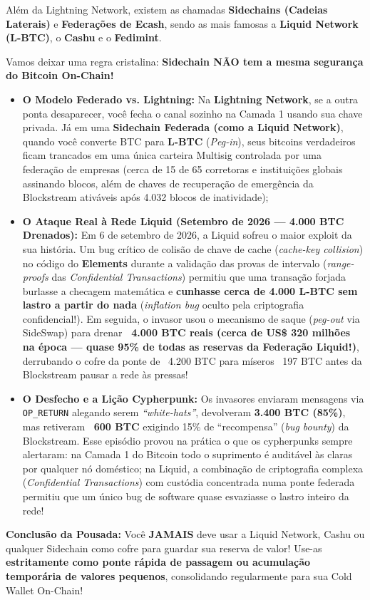 \documentclass{pousadaguide}
\begin{document}
Além da Lightning Network, existem as chamadas \textbf{Sidechains (Cadeias Laterais)} e \textbf{Federações de Ecash}, sendo as mais famosas a \textbf{Liquid Network (L-BTC)}, o \textbf{Cashu} e o \textbf{Fedimint}.

\begin{atencao}
Vamos deixar uma regra cristalina: \textbf{Sidechain NÃO tem a mesma segurança do Bitcoin On-Chain!}
\begin{itemize}
  \item \textbf{O Modelo Federado vs. Lightning:} Na \textbf{Lightning Network}, se a outra ponta desaparecer, você fecha o canal sozinho na Camada 1 usando sua chave privada. Já em uma \textbf{Sidechain Federada (como a Liquid Network)}, quando você converte BTC para \textbf{L-BTC} (\emph{Peg-in}), seus bitcoins verdadeiros ficam trancados em uma única carteira Multisig controlada por uma federação de empresas (cerca de 15 de 65 corretoras e instituições globais assinando blocos, além de chaves de recuperação de emergência da Blockstream ativáveis após 4.032 blocos de inatividade);
  \item \textbf{O Ataque Real à Rede Liquid (Setembro de 2026 — 4.000 BTC Drenados):} Em 6 de setembro de 2026, a Liquid sofreu o maior exploit da sua história. Um bug crítico de colisão de chave de cache (\emph{cache-key collision}) no código do \textbf{Elements} durante a validação das provas de intervalo (\emph{range-proofs} das \emph{Confidential Transactions}) permitiu que uma transação forjada burlasse a checagem matemática e \textbf{cunhasse cerca de 4.000 L-BTC sem lastro a partir do nada} (\emph{inflation bug} oculto pela criptografia confidencial!). Em seguida, o invasor usou o mecanismo de saque (\emph{peg-out} via SideSwap) para drenar \textbf{~4.000 BTC reais (cerca de US\$ 320 milhões na época — quase 95\% de todas as reservas da Federação Liquid!)}, derrubando o cofre da ponte de ~4.200 BTC para míseros ~197 BTC antes da Blockstream pausar a rede às pressas!
  \item \textbf{O Desfecho e a Lição Cypherpunk:} Os invasores enviaram mensagens via \texttt{OP\_RETURN} alegando serem \emph{``white-hats''}, devolveram \textbf{3.400 BTC (85\%)}, mas retiveram \textbf{~600 BTC} exigindo 15\% de ``recompensa'' (\emph{bug bounty}) da Blockstream. Esse episódio provou na prática o que os cypherpunks sempre alertaram: na Camada 1 do Bitcoin todo o suprimento é auditável às claras por qualquer nó doméstico; na Liquid, a combinação de criptografia complexa (\emph{Confidential Transactions}) com custódia concentrada numa ponte federada permitiu que um único bug de software quase esvaziasse o lastro inteiro da rede!
\end{itemize}
\textbf{Conclusão da Pousada:} Você \textbf{JAMAIS} deve usar a Liquid Network, Cashu ou qualquer Sidechain como cofre para guardar sua reserva de valor! Use-as \textbf{estritamente como ponte rápida de passagem ou acumulação temporária de valores pequenos}, consolidando regularmente para sua Cold Wallet On-Chain!
\end{atencao}
\end{document}
